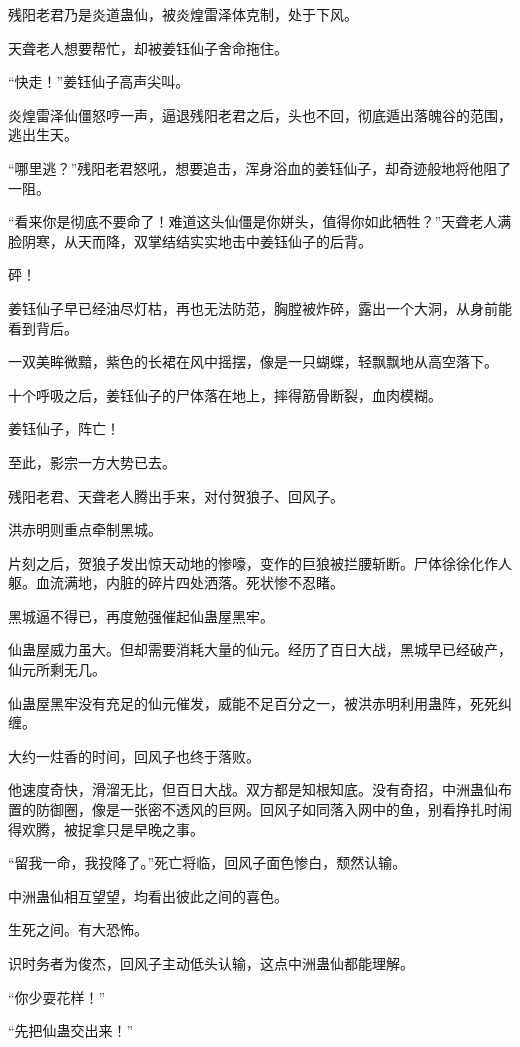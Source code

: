 \begin{this_body}
残阳老君乃是炎道蛊仙，被炎煌雷泽体克制，处于下风。

天聋老人想要帮忙，却被姜钰仙子舍命拖住。

“快走！”姜钰仙子高声尖叫。

炎煌雷泽仙僵怒哼一声，逼退残阳老君之后，头也不回，彻底遁出落魄谷的范围，逃出生天。

“哪里逃？”残阳老君怒吼，想要追击，浑身浴血的姜钰仙子，却奇迹般地将他阻了一阻。

“看来你是彻底不要命了！难道这头仙僵是你姘头，值得你如此牺牲？”天聋老人满脸阴寒，从天而降，双掌结结实实地击中姜钰仙子的后背。

砰！

姜钰仙子早已经油尽灯枯，再也无法防范，胸膛被炸碎，露出一个大洞，从身前能看到背后。

一双美眸微黯，紫色的长裙在风中摇摆，像是一只蝴蝶，轻飘飘地从高空落下。

十个呼吸之后，姜钰仙子的尸体落在地上，摔得筋骨断裂，血肉模糊。

姜钰仙子，阵亡！

至此，影宗一方大势已去。

残阳老君、天聋老人腾出手来，对付贺狼子、回风子。

洪赤明则重点牵制黑城。

片刻之后，贺狼子发出惊天动地的惨嚎，变作的巨狼被拦腰斩断。尸体徐徐化作人躯。血流满地，内脏的碎片四处洒落。死状惨不忍睹。

黑城逼不得已，再度勉强催起仙蛊屋黑牢。

仙蛊屋威力虽大。但却需要消耗大量的仙元。经历了百日大战，黑城早已经破产，仙元所剩无几。

仙蛊屋黑牢没有充足的仙元催发，威能不足百分之一，被洪赤明利用蛊阵，死死纠缠。

大约一炷香的时间，回风子也终于落败。

他速度奇快，滑溜无比，但百日大战。双方都是知根知底。没有奇招，中洲蛊仙布置的防御圈，像是一张密不透风的巨网。回风子如同落入网中的鱼，别看挣扎时闹得欢腾，被捉拿只是早晚之事。

“留我一命，我投降了。”死亡将临，回风子面色惨白，颓然认输。

中洲蛊仙相互望望，均看出彼此之间的喜色。

生死之间。有大恐怖。

识时务者为俊杰，回风子主动低头认输，这点中洲蛊仙都能理解。

“你少耍花样！”

“先把仙蛊交出来！”


\end{this_body}
